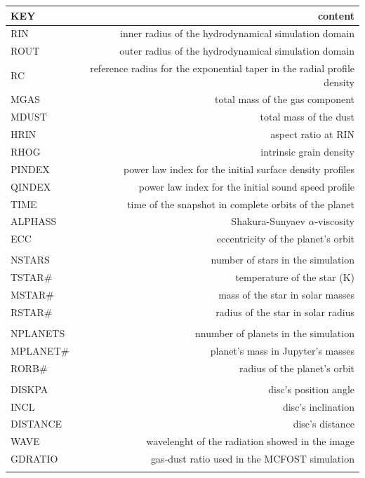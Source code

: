 \documentclass[a4paper,10pt]{report}
\begin{document}
\begin{table}
    \begin{center}
        \begin{tabular}{l r}
        \toprule
        KEY & content \\
        \midrule   
        RIN & inner radius of the hydrodynamical simulation domain\\
        ROUT & outer radius of the hydrodynamical simulation domain\\
        RC & reference radius for the exponential taper in the radial profile density\\ 
        MGAS & total mass of the gas component\\
        MDUST & total mass of the dust\\
        HRIN & aspect ratio at RIN \\ 
        RHOG & intrinsic grain density\\ 
        PINDEX & power law index for the initial surface density profiles\\
        QINDEX & power law index for the initial sound speed profile \\
        TIME & time of the snapshot in complete orbits of the planet \\
        ALPHASS & Shakura-Sunyaev $\alpha$-viscosity\\
        ECC & eccentricity of the planet's orbit\\\\

        NSTARS & number of stars in the simulation \\
        TSTAR\# & temperature of the star (K)\\
        MSTAR\# & mass of the star in solar masses \\
        RSTAR\# & radius of the star in solar radius \\ \\
        
        NPLANETS & nnumber of planets in the simulation\\
        MPLANET\# & planet's mass in Jupyter's masses \\
        RORB\# & radius of the planet's orbit\\ \\
        
        DISKPA & disc's position angle\\
        INCL & disc's inclination\\
        DISTANCE & disc's distance \\
        WAVE & wavelenght of the radiation showed in the image\\
        GDRATIO & gas-dust ratio used in the MCFOST simulation \\ \\


\end{tabular}
\end{center}
\end{table}
\end{document}
